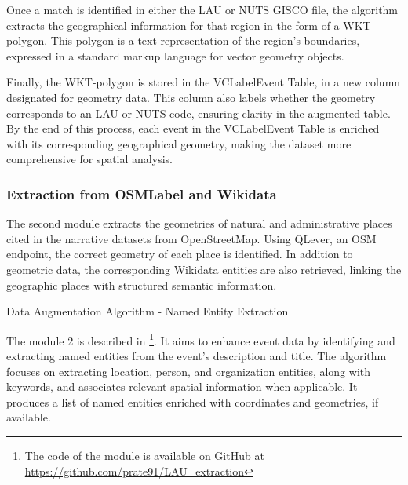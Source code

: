 Once a match is identified in either the LAU or NUTS GISCO file, the algorithm extracts the geographical information for that region in the form of a WKT-polygon. This polygon is a text representation of the region's boundaries, expressed in a standard markup language for vector geometry objects.

Finally, the WKT-polygon is stored in the \acrshort{VCLabel}Event Table, in a new column designated for geometry data. This column also labels whether the geometry corresponds to an LAU or NUTS code, ensuring clarity in the augmented table. By the end of this process, each event in the \acrshort{VCLabel}Event Table is enriched with its corresponding geographical geometry, making the dataset more comprehensive for spatial analysis.


\subsubsection{Extraction from \acrshort{OSMLabel} and Wikidata}\label{VII-subsubsec:osm-wikidata}
The second module extracts the geometries of natural and administrative places cited in the narrative datasets from OpenStreetMap. Using QLever, an OSM endpoint, the correct geometry of each place is identified. In addition to geometric data, the corresponding Wikidata entities are also retrieved, linking the geographic places with structured semantic information.

\begin{algorithm}[H]
\caption{Data Augmentation Algorithm - Named Entity Extraction}
\label{alg:entityextraction}
\SetAlgoLined
{}
\end{algorithm}

The module 2 is described in \footnote{The code of the module is available on GitHub at \url{https://github.com/prate91/LAU_extraction}}. It aims to enhance event data by identifying and extracting named entities from the event's description and title. The algorithm focuses on extracting location, person, and organization entities, along with keywords, and associates relevant spatial information when applicable. It produces a list of named entities enriched with coordinates and geometries, if available.

